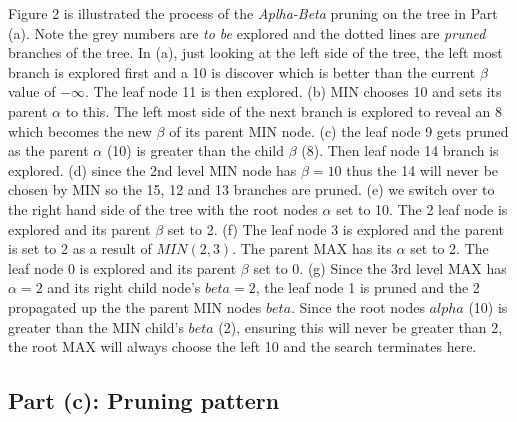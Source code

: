 \documentclass[a4paper,12pt]{article}
\begin{document}
Figure 2 is illustrated the process of the \emph{Aplha-Beta} pruning on the tree in Part (a). Note the grey numbers are \emph{to be} explored and the dotted lines are \emph{pruned} branches of the tree. In (a), just looking at the left side of the tree, the left most branch is explored first and a 10 is discover which is better than the current $\beta$ value of $-\infty$. The leaf node 11 is then explored. (b) MIN chooses 10 and sets its parent $\alpha$ to this. The left most side of the next branch is explored to reveal an 8 which becomes the new $\beta$ of its parent MIN node. (c) the leaf node 9 gets pruned as the parent $\alpha$ (10) is greater than the child $\beta$ (8). Then leaf node 14 branch is explored. (d) since the 2nd level MIN node has $\beta = 10$ thus the 14 will never be chosen by MIN so the 15, 12 and 13 branches are pruned. (e) we switch over to the right hand side of the tree with the root nodes $\alpha$ set to 10. The 2 leaf node is explored  and its parent $\beta$ set to 2. (f) The leaf node 3 is explored and the parent is set to 2 as a result of $MIN(2, 3)$. The parent MAX has its $\alpha$ set to 2. The leaf node 0 is explored and its parent $\beta$ set to 0. (g) Since the 3rd level MAX has $\alpha = 2$ and its right child node's $beta = 2$, the leaf node 1 is pruned and the 2 propagated up the the parent MIN nodes $beta$. Since the root nodes $alpha$ (10) is greater than the MIN child's $beta$ (2), ensuring this will never be greater than 2, the root MAX will always choose the left 10 and the search terminates here.

\subsection*{Part (c): Pruning pattern}
\end{document}
